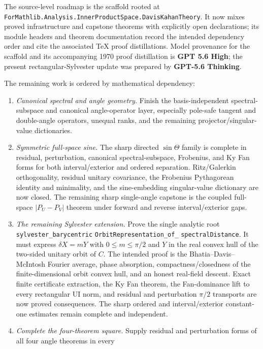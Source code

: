 \documentclass[11pt]{article}
\theoremstyle{remark}
\begin{document}
The source-level roadmap is the scaffold rooted at
\texttt{ForMathlib.Analysis.InnerProductSpace.DavisKahanTheory}.  It now mixes
proved infrastructure and capstone theorems with explicitly open declarations;
its module headers and theorem documentation record the intended dependency
order and cite the associated TeX proof distillations.  Model provenance for
the scaffold and its accompanying 1970 proof distillation is
\textbf{GPT 5.6 High}; the present rectangular-Sylvester update was prepared by
\textbf{GPT-5.6 Thinking}.

The remaining work is ordered by mathematical dependency:

\begin{enumerate}
\item \emph{Canonical spectral and angle geometry.}
  Finish the basis-independent spectral-subspace and canonical angle-operator
  layer, especially pole-safe tangent and double-angle operators, unequal
  ranks, and the remaining projector/singular-value dictionaries.
\item \emph{Symmetric full-space sine.}
  The sharp directed $\sin\Theta$ family is complete in residual,
  perturbation, canonical spectral-subspace, Frobenius, and Ky Fan forms for
  both interval/exterior and ordered separation.  Ritz/Galerkin orthogonality,
  residual unitary covariance, the Frobenius Pythagorean identity and
  minimality, and the sine-embedding singular-value dictionary are now closed.
  The remaining sharp single-angle capstone is the coupled full-space
  $|P_U-P_V|$ theorem under forward and reverse interval/exterior gaps.
\item \emph{The remaining Sylvester extension.}
  Prove the single analytic root
  \texttt{sylvester\_barycentric}\allowbreak
  \texttt{OrbitRepresentation\_of\_}\allowbreak
  \texttt{spectralDistance}.  It must express $\delta X=mY$ with
  $0\le m\le\pi/2$ and $Y$ in the real convex hull of the two-sided unitary
  orbit of $C$.  The intended proof is the Bhatia--Davis--McIntosh Fourier
  average, phase absorption, compactness/closedness of the finite-dimensional
  orbit convex hull, and an honest real-field descent.  Exact finite
  certificate extraction, the Ky Fan theorem, the Fan-dominance lift to every
  rectangular UI norm, and residual and perturbation $\pi/2$ transports are
  now proved consequences.  The sharp ordered and interval/exterior
  constant-one estimates remain complete and independent.
\item \emph{Complete the four-theorem square.}
  Supply residual and perturbation forms of all four angle theorems in every

\end{enumerate}
\end{document}
